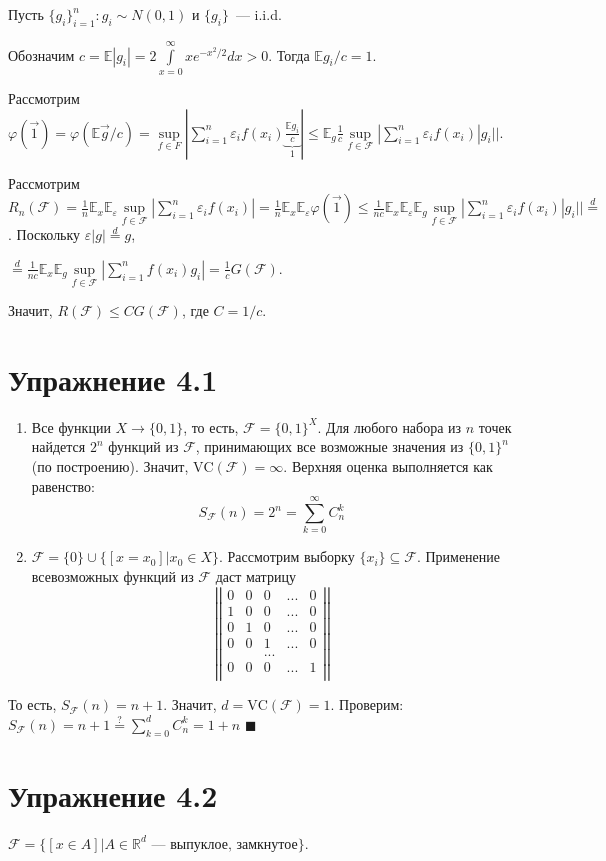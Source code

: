 \documentclass[a4paper]{article}
\newcommand{\matrixl}{\left|\left|}
\newcommand{\matrixr}{\right|\right|}
\newcommand{\VC}{\mbox{VC}}
\newcommand{\F}{\mathcal{F}}
\newcommand{\R}{\mathbb{R}}
\newcommand{\E}{\mathbb{E}}
\def\eps{\varepsilon}
\begin{document}
Пусть $\{g_i\}_{i=1}^n\colon g_i\sim N(0,1)$ и $\{g_i\}$~--- i.i.d.

Обозначим $c=\mathbb{E}|g_i|=2\int\limits_{x=0}^\infty x e^{-x^2/2}dx >0$. Тогда $\E g_i/c=1$.

Рассмотрим $\varphi(\vec{1})=\varphi(\E\vec{g}/c)=\sup\limits_{f\in F}|\sum\limits_{i=1}^n \eps_i f(x_i) \underbrace{\frac{\E g_i}{c}}_1|\leqslant \E_{g}\frac{1}{c}\sup\limits_{f\in \F}|\sum\limits_{i=1}^n \eps_if(x_i)|g_i||$.

Рассмотрим $R_n(\F)=\frac{1}{n}\E_x\E_\eps\sup\limits_{f\in\F}|\sum\limits_{i=1}^n \eps_if(x_i)|=\frac{1}{n}\E_x\E_\eps \varphi(\vec{1})\leqslant \frac{1}{nc}\E_x\E_\eps\E_g \sup\limits_{f\in \F}|\sum\limits_{i=1}^n \eps_if(x_i)|g_i||\overset{d}{=}$. Поскольку $\eps |g|\overset{d}{=}g$,

$\overset{d}{=}\frac{1}{nc}\E_x\E_g\sup\limits_{f\in \F}|\sum\limits_{i=1}^n f(x_i)g_i|=\frac{1}{c}G(\F)$.

Значит, $R(\F)\leqslant CG(\F)$, где $C=1/c$.
\section*{Упражнение 4.1}
\begin{enumerate}
\item Все функции $X\to \{0,1\}$, то есть, $\F=\{0,1\}^X$. Для любого набора из $n$ точек найдется $2^n$ функций из $\F$, принимающих все возможные значения из $\{0,1\}^n$ (по построению). Значит, $\VC(\F)=\infty$. Верхняя оценка выполняется как равенство: $$S_\F(n)=2^n=\sum\limits_{k=0}^\infty C_n^k$$
\item $\F = \{0\}\cup \{[x=x_0]\big|x_0\in X \}$. Рассмотрим выборку $\{x_i\}\subseteq\F$. Применение всевозможных функций из $\F$ даст матрицу
$$\matrixl\begin{array}{ccccc}
0 & 0 & 0 & ... & 0\\
1 & 0 & 0 & ... & 0\\
0 & 1 & 0 & ... & 0\\
0 & 0 & 1 & ... & 0\\
&&...&&\\
0 & 0 & 0 & ... & 1\\
\end{array}\matrixr$$
\end{enumerate}
То есть, $S_\F(n)=n+1$. Значит, $d=\VC(\F)=1$. Проверим: $S_\F(n)=n+1\overset{?}{=}\sum\limits_{k=0}^dC_n^k=1+n$ $\blacksquare$
\section*{Упражнение 4.2}
$\F=\{[x\in A]\big| A\in\R^d \mbox{~--- выпуклое, замкнутое}\}$.
\end{document}
